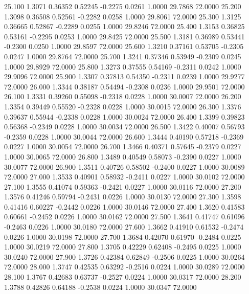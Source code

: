   25.100   1.3071   0.36352   0.52245  -0.2275   0.0261   1.0000  29.7868  72.0000
  25.200   1.3098   0.36508   0.52561  -0.2282   0.0258   1.0000  29.8061  72.0000
  25.300   1.3125   0.36665   0.52867  -0.2289   0.0255   1.0000  29.8246  72.0000
  25.400   1.3153   0.36825   0.53161  -0.2295   0.0253   1.0000  29.8425  72.0000
  25.500   1.3181   0.36989   0.53441  -0.2300   0.0250   1.0000  29.8597  72.0000
  25.600   1.3210   0.37161   0.53705  -0.2305   0.0247   1.0000  29.8764  72.0000
  25.700   1.3241   0.37346   0.53949  -0.2309   0.0245   1.0000  29.8929  72.0000
  25.800   1.3273   0.37555   0.54169  -0.2311   0.0242   1.0000  29.9096  72.0000
  25.900   1.3307   0.37813   0.54350  -0.2311   0.0239   1.0000  29.9277  72.0000
  26.000   1.3344   0.38187   0.54494  -0.2308   0.0236   1.0000  29.9501  72.0000
  26.100   1.3331   0.39260   0.55098  -0.2318   0.0228   1.0000  30.0007  72.0000
  26.200   1.3354   0.39449   0.55520  -0.2328   0.0228   1.0000  30.0015  72.0000
  26.300   1.3376   0.39637   0.55944  -0.2338   0.0228   1.0000  30.0024  72.0000
  26.400   1.3399   0.39823   0.56368  -0.2349   0.0228   1.0000  30.0034  72.0000
  26.500   1.3422   0.40007   0.56793  -0.2359   0.0228   1.0000  30.0044  72.0000
  26.600   1.3444   0.40190   0.57218  -0.2369   0.0227   1.0000  30.0054  72.0000
  26.700   1.3466   0.40371   0.57645  -0.2379   0.0227   1.0000  30.0065  72.0000
  26.800   1.3489   0.40549   0.58073  -0.2390   0.0227   1.0000  30.0077  72.0000
  26.900   1.3511   0.40726   0.58502  -0.2400   0.0227   1.0000  30.0089  72.0000
  27.000   1.3533   0.40901   0.58932  -0.2411   0.0227   1.0000  30.0102  72.0000
  27.100   1.3555   0.41074   0.59363  -0.2421   0.0227   1.0000  30.0116  72.0000
  27.200   1.3576   0.41246   0.59794  -0.2431   0.0226   1.0000  30.0130  72.0000
  27.300   1.3598   0.41416   0.60227  -0.2442   0.0226   1.0000  30.0146  72.0000
  27.400   1.3620   0.41583   0.60661  -0.2452   0.0226   1.0000  30.0162  72.0000
  27.500   1.3641   0.41747   0.61096  -0.2463   0.0226   1.0000  30.0180  72.0000
  27.600   1.3662   0.41910   0.61532  -0.2474   0.0226   1.0000  30.0198  72.0000
  27.700   1.3684   0.42070   0.61970  -0.2484   0.0225   1.0000  30.0219  72.0000
  27.800   1.3705   0.42229   0.62408  -0.2495   0.0225   1.0000  30.0240  72.0000
  27.900   1.3726   0.42384   0.62849  -0.2506   0.0225   1.0000  30.0264  72.0000
  28.000   1.3747   0.42535   0.63292  -0.2516   0.0224   1.0000  30.0289  72.0000
  28.100   1.3767   0.42683   0.63737  -0.2527   0.0224   1.0000  30.0317  72.0000
  28.200   1.3788   0.42826   0.64188  -0.2538   0.0224   1.0000  30.0347  72.0000
